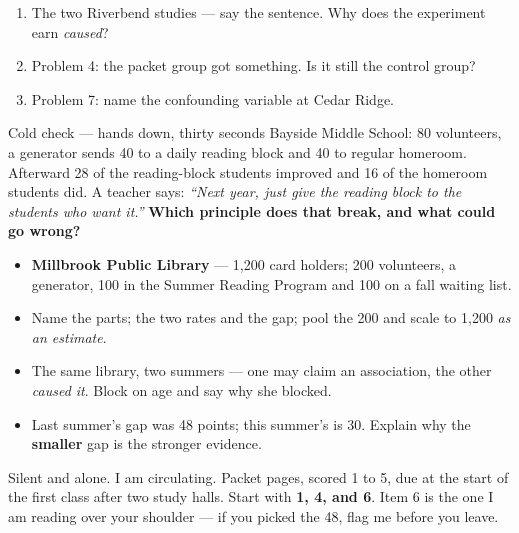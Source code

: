 \documentclass[aspectratio=169, 11pt]{beamer}
\begin{document}
\begin{frame}[t, plain]
  \vspace{4pt}
  \begin{enumerate}\setlength{\itemsep}{4pt}
    \item The two Riverbend studies --- say the sentence. Why does the experiment earn
          \emph{caused}?
    \item Problem 4: the packet group got something. Is it still the control group?
    \item Problem 7: name the confounding variable at Cedar Ridge.
  \end{enumerate}
  \vspace{4pt}
  \begin{block}{Cold check --- hands down, thirty seconds}
    Bayside Middle School: 80 volunteers, a generator sends 40 to a daily reading block and 40
    to regular homeroom. Afterward 28 of the reading-block students improved and 16 of the
    homeroom students did. A teacher says: \emph{``Next year, just give the reading block to
    the students who want it.''} \textbf{Which principle does that break, and what could go
    wrong?}
  \end{block}
\end{frame}

\begin{frame}[t, plain]
  \begin{itemize}\setlength{\itemsep}{5pt}
    \item \textbf{Millbrook Public Library} --- 1{,}200 card holders; 200 volunteers, a
          generator, 100 in the Summer Reading Program and 100 on a fall waiting list.
    \item Name the parts; the two rates and the gap; pool the 200 and scale to 1{,}200
          \emph{as an estimate}.
    \item The same library, two summers --- one may claim an association, the other
          \emph{caused it}. Block on age and say why she blocked.
    \item Last summer's gap was 48 points; this summer's is 30. Explain why the
          \textbf{smaller} gap is the stronger evidence.
  \end{itemize}
  \begin{block}{Silent and alone. I am circulating. Packet pages, scored 1 to 5, due at the start of the first class after two study halls.}
    Start with \textbf{1, 4, and 6}. Item 6 is the one I am reading over your shoulder --- if
    you picked the 48, flag me before you leave.
  \end{block}
\end{frame}
\end{document}
